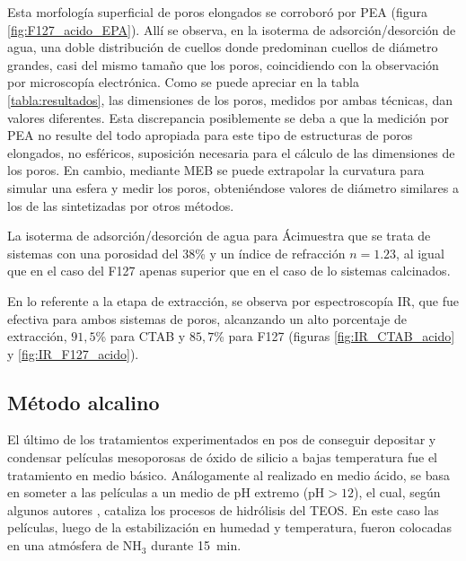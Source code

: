 		 Esta morfología superficial de poros elongados se corroboró por PEA (figura \ref{fig:F127_acido_EPA}). Allí se observa, en la isoterma de adsorción/desorción de agua, una doble distribución de cuellos donde predominan cuellos de diámetro grandes, casi del mismo tamaño que los poros, coincidiendo con la observación por microscopía electrónica.
		 Como se puede apreciar en la tabla \ref{tabla:resultados}, las dimensiones de los poros, medidos por ambas técnicas, dan valores diferentes. Esta discrepancia posiblemente se deba a que la medición por PEA no resulte del todo apropiada para este tipo de estructuras de poros elongados, no esféricos, suposición necesaria para el cálculo de las dimensiones de los poros. En cambio, mediante MEB se puede extrapolar la curvatura para simular una esfera y medir los poros, obteniéndose valores de diámetro similares a los de las \pdmF\space sintetizadas por otros métodos.

		 La isoterma de adsorción/desorción de agua para Áci\pdmC\space muestra que se trata de sistemas con una porosidad del 38\% y un índice de refracción $n=1.23$, al igual que en el caso del F127 apenas superior que en el caso de lo sistemas calcinados.
		
		 En lo referente a la etapa de extracción, se observa por espectroscopía IR, que fue efectiva para ambos sistemas de poros, alcanzando un alto porcentaje de extracción, $91,5$\% para CTAB y $85,7$\% para F127 (figuras \ref{fig:IR_CTAB_acido} y \ref{fig:IR_F127_acido}).  	
				
	 \subsection{Método alcalino}

	 	 El último de los tratamientos experimentados en pos de conseguir depositar y condensar películas mesoporosas de óxido de silicio a bajas temperatura fue el tratamiento en medio básico. Análogamente al realizado en medio ácido, se basa en someter a las películas a un medio de pH extremo (pH$>12$), el cual, según algunos autores \cite{Soler-Illia2011,Huo1996,Ichinose2002,GonzalezSolveyra2017}, cataliza los procesos de hidrólisis del TEOS. En este caso las películas, luego de la estabilización en humedad y temperatura, fueron colocadas en una atmósfera de NH$_3$ durante \SI{15}{\minute}. 

